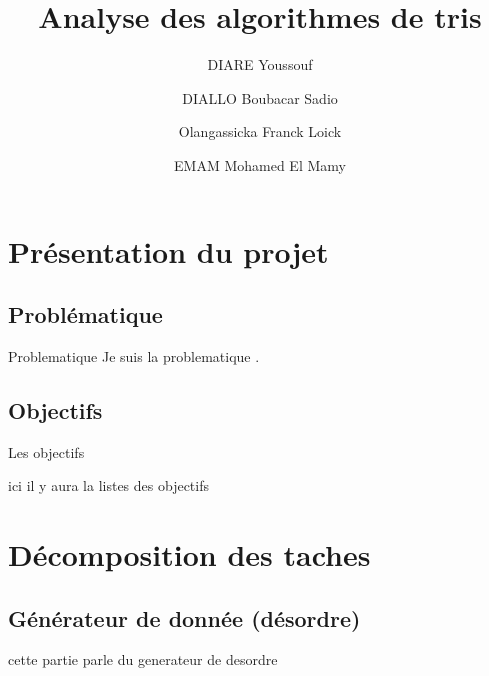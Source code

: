 \documentclass{beamer}
\title{Analyse des algorithmes de tris}
\author{DIARE Youssouf \\ \and DIALLO Boubacar Sadio\\ \and Olangassicka Franck Loick\\ \and EMAM Mohamed El Mamy}
\institute{Université de Caen Normandie\\
L3 Info\\ Groupe 2A}
\begin{document}
\begin{frame}
\titlepage
\end{frame}


\begin{frame}
\tableofcontents
\end{frame}


\section{Présentation du projet}

\subsection{Problématique}

\begin{frame}
%
\begin{block}{Problematique }
	Je suis la problematique .
\end{block}

\end{frame}



\subsection{Objectifs}

\begin{frame}
%
\begin{exampleblock}{Les objectifs }

	ici il y aura la listes des objectifs 
	\end{exampleblock}

\end{frame}




\section{Décomposition des taches }

\subsection{Générateur de donnée (désordre)}

\begin{frame}

	cette partie parle du generateur de desordre 

\end{frame}
\end{document}
